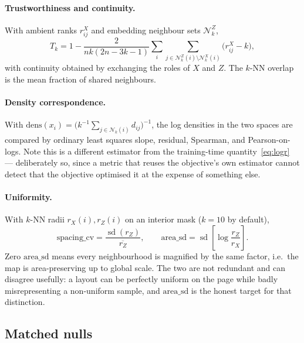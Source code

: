 \documentclass[12pt]{iopart}
\theoremstyle{definition}
\theoremstyle{plain}
\theoremstyle{remark}
\DeclareMathOperator{\sd}{sd}
\newcommand{\Nb}{\mathcal{N}}
\begin{document}
\paragraph{Trustworthiness and continuity.}
With ambient ranks $r^X_{ij}$ and embedding neighbour sets $\Nb^Z_k$,
\begin{equation}
\label{eq:trust}
T_k
=
1-\frac{2}{nk(2n-3k-1)}
\sum_i\sum_{j\in\Nb^Z_k(i)\setminus\Nb^X_k(i)}\bigl(r^X_{ij}-k\bigr),
\end{equation}
with continuity obtained by exchanging the roles of $X$ and $Z$. The $k$-NN
overlap is the mean fraction of shared neighbours.

\paragraph{Density correspondence.}
With $\mathrm{dens}(x_i)=\bigl(k^{-1}\sum_{j\in\Nb_k(i)}d_{ij}\bigr)^{-1}$, the
log densities in the two spaces are compared by ordinary least squares slope,
residual, Spearman, and Pearson-on-logs. Note this is a different estimator from
the training-time quantity~\eqref{eq:logr} --- deliberately so, since a metric
that reuses the objective's own estimator cannot detect that the objective
optimised it at the expense of something else.

\paragraph{Uniformity.}
With $k$-NN radii $r_X(i),r_Z(i)$ on an interior mask ($k=10$ by default),
\begin{equation}
\label{eq:uniformity}
\mathrm{spacing\_cv}=\frac{\sd(r_Z)}{\overline{r_Z}},
\qquad
\mathrm{area\_sd}=\sd\!\left[\log\frac{r_Z}{r_X}\right].
\end{equation}
Zero $\mathrm{area\_sd}$ means every neighbourhood is magnified by the same
factor, i.e.\ the map is area-preserving up to global scale. The two are not
redundant and can disagree usefully: a layout can be perfectly uniform on the
page while badly misrepresenting a non-uniform sample, and
$\mathrm{area\_sd}$ is the honest target for that distinction.

\subsection{Matched nulls}
\label{sec:null}
\end{document}
